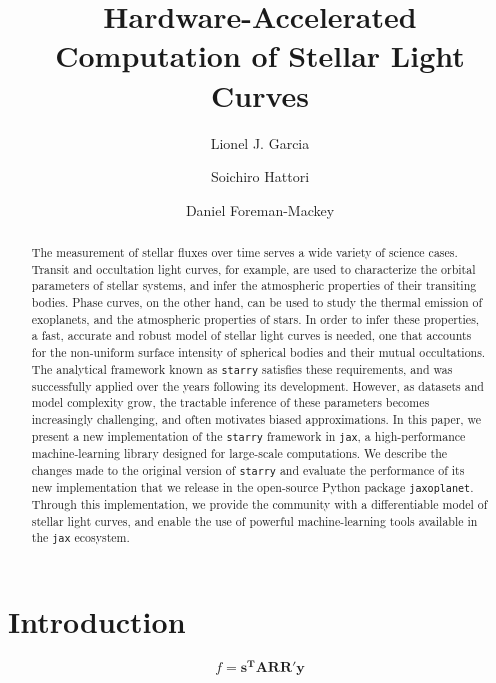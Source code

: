 \documentclass[modern]{aastex631}
\begin{document}
\title{Hardware-Accelerated Computation of Stellar Light Curves}

\author{Lionel J. Garcia}
\author{Soichiro Hattori}
\author{Daniel Foreman-Mackey}

\keywords{}

\begin{abstract}
    The measurement of stellar fluxes over time serves a wide variety of science cases. Transit and occultation light curves, for example, are used to characterize the orbital parameters of stellar systems, and infer the atmospheric properties of their transiting bodies. Phase curves, on the other hand, can be used to study the thermal emission of exoplanets, and the atmospheric properties of stars. In order to infer these properties, a fast, accurate and robust model of stellar light curves is needed, one that accounts for the non-uniform surface intensity of spherical bodies and their mutual occultations. The analytical framework known as \texttt{starry} satisfies these requirements, and was successfully applied over the years following its development. However, as datasets and model complexity grow, the tractable inference of these parameters becomes increasingly challenging, and often motivates biased approximations. In this paper, we present a new implementation of the \texttt{starry} framework in \texttt{jax}, a high-performance machine-learning library designed for large-scale computations. We describe the changes made to the original version of \texttt{starry} and evaluate the performance of its new implementation that we release in the open-source Python package \texttt{jaxoplanet}. Through this implementation, we provide the community with a differentiable model of stellar light curves, and enable the use of powerful machine-learning tools available in the \texttt{jax} ecosystem.

\end{abstract}

\section*{Introduction}

\begin{equation}\label{eq:starry}
    f = \bm{s^TARR'y}
\end{equation}

\end{document}
